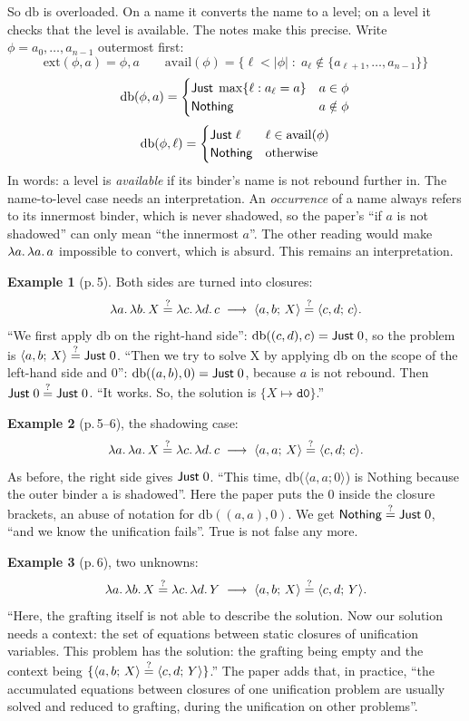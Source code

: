So $\mathrm{db}$ is overloaded. On a name it converts the name to a level; on a level it checks that
the level is available. The notes make this precise. Write $\phi=a_0,\dots,a_{n-1}$ outermost first:
\[
  \mathrm{ext}(\phi,a)=\phi,a\qquad
  \mathrm{avail}(\phi)=\{\ell<|\phi| \;:\; a_\ell\notin\{a_{\ell+1},\dots,a_{n-1}\}\}
\]
\[
  \mathrm{db}(\phi,a)=\begin{cases}\mathsf{Just}\;\max\{\ell : a_\ell=a\} & a\in\phi\\ \mathsf{Nothing} & a\notin\phi\end{cases}
\]
\[
  \mathrm{db}(\phi,\ell)=\begin{cases}\mathsf{Just}\;\ell & \ell\in\mathrm{avail}(\phi)\\ \mathsf{Nothing}&\text{otherwise}\end{cases}
\]
In words: a level is \emph{available} if its binder's name is not rebound further in. The
name-to-level case needs an interpretation. An \emph{occurrence} of a name always refers to its
innermost binder, which is never shadowed, so the paper's \enquote{if $a$ is not shadowed} can only
mean \enquote{the innermost $a$}. The other reading would make $\lambda a.\,\lambda a.\,a$ impossible to
convert, which is absurd. This remains an interpretation.

\begin{tutorial}
\textbf{Example 1} (p.\,5). Both sides are turned into closures:
\[
  \lambda a.\,\lambda b.\,X \stackrel{?}{=} \lambda c.\,\lambda d.\,c
  \;\longrightarrow\; \langle a,b;\,X\rangle \stackrel{?}{=} \langle c,d;\,c\rangle.
\]
\enquote{We first apply db on the right-hand side}: $\mathrm{db}((c,d),c)=\mathsf{Just}\;0$, so the problem
is $\langle a,b;\,X\rangle\stackrel{?}{=}\mathsf{Just}\;0$. \enquote{Then we try to solve X by applying db on the scope of the
left-hand side and 0}: $\mathrm{db}((a,b),0)=\mathsf{Just}\;0$, because $a$ is not rebound. Then
$\mathsf{Just}\;0\stackrel{?}{=}\mathsf{Just}\;0$. \enquote{It works. So, the solution is $\{X\mapsto\texttt{d0}\}$.}

\medskip
\textbf{Example 2} (p.\,5--6), the shadowing case:
\[
  \lambda a.\,\lambda a.\,X \stackrel{?}{=} \lambda c.\,\lambda d.\,c
  \;\longrightarrow\; \langle a,a;\,X\rangle \stackrel{?}{=} \langle c,d;\,c\rangle.
\]
As before, the right side gives $\mathsf{Just}\;0$. \enquote{This time, db($\langle a, a; 0\rangle$) is
Nothing because the outer binder a is shadowed}. Here the paper puts the $0$ inside the closure
brackets, an abuse of notation for $\mathrm{db}((a,a),0)$. We get $\mathsf{Nothing}\stackrel{?}{=}\mathsf{Just}\;0$,
\enquote{and we know the unification fails}. True is not false any more.

\medskip
\textbf{Example 3} (p.\,6), two unknowns:
\[
  \lambda a.\,\lambda b.\,X \stackrel{?}{=} \lambda c.\,\lambda d.\,Y
  \;\longrightarrow\; \langle a,b;\,X\rangle \stackrel{?}{=} \langle c,d;\,Y\rangle.
\]
\enquote{Here, the grafting itself is not able to describe the solution. Now our solution needs a
context: the set of equations between static closures of unification variables. This problem has the
solution: the grafting being empty and the context being $\{\langle a,b;\,X\rangle\stackrel{?}{=}\langle c,d;\,Y\rangle\}$.}
The paper adds that, in practice, \enquote{the accumulated equations between closures of one
unification problem are usually solved and reduced to grafting, during the unification on other
problems}.
\end{tutorial}

